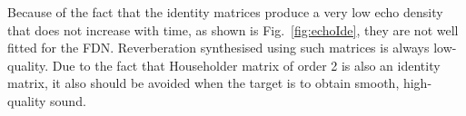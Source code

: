 \documentclass[twoside,a4paper]{article}
\begin{document}
Because of the fact that the identity matrices produce a very low echo density that does not increase with time, as shown is Fig.~\ref{fig:echoIde}, they are not well fitted for the FDN. Reverberation synthesised using such matrices is always low-quality.  Due to the fact that Householder matrix of order 2 is also an identity matrix, it also should be avoided when the target is to obtain smooth, high-quality sound. 
\begin{figure}[ht!]
    \centering
    \hfill
     \hfill
     \hfill

\end{figure}
\end{document}
